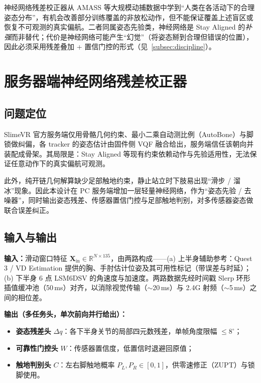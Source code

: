 \documentclass[scheme=plain,UTF8,11pt,a4paper]{ctexart}
\begin{document}
神经网络残差校正器从 AMASS 等大规模动捕数据中学到“人类在各活动下的合理姿态分布”，有机会改善部分训练覆盖的非放松动作，但不能保证覆盖上述盲区或恢复不可观测的真实偏航。二者同属姿态先验类，神经网络是 Stay Aligned 的\emph{补强}而非替代；代价是神经网络可能产生“幻觉”（将姿态掰到合理但错误的位置），因此必须采用残差叠加 + 置信门控的形式（见~\ref{subsec:discipline}）。

\section{服务器端神经网络残差校正器}
\label{sec:nn}

\subsection{问题定位}

SlimeVR 官方服务端仅用骨骼几何约束、最小二乘自动测比例（AutoBone）与脚锁做纠偏，各 tracker 的姿态估计由固件侧 VQF 融合给出，服务端信任该朝向并装配成骨架。其局限是：Stay Aligned 等现有约束依赖动作与先验适用性，无法保证任意动作下的真实偏航可观测。

此外，纯开链几何解算缺少足部触地约束，静止站立时下肢易出现“滑步 / 溜冰”现象。因此本设计在 PC 服务端增加一层轻量神经网络，作为“姿态先验 / 去噪器”，同时输出姿态残差、传感器置信门控与足部触地判别，对多传感器姿态做联合误差纠正。

\subsection{输入与输出}

\textbf{输入：}滑动窗口特征 $\mathbf{X}_{\text{in}} \in \mathbb{R}^{N \times 135}$，由两路构成——(a) 上半身辅助参考：Quest 3 / VD Estimation 提供的胸、手肘估计位姿及其可用性标记（带误差与时延）；(b) 下半身 6 点 LSM6DSV 的角速度与加速度。两路数据先经时间戳 Slerp 环形插值缓冲池（50\,ms）对齐，以消除视觉传输（$\sim$20\,ms）与 2.4G 射频（$\sim$5\,ms）之间的相位差。

\textbf{输出（多任务头，单次前向并行给出）：}
\begin{itemize}
    \item \textbf{姿态残差头} $\Delta q$：各下半身关节的局部四元数残差，单帧角度限幅 $\le 8^{\circ}$；
    \item \textbf{可靠性门控头} $W$：传感器置信度，低置信时退避回原值；
    \item \textbf{触地判别头} $C$：左右脚触地概率 $P_L, P_R \in [0,1]$，供零速修正（ZUPT）与锁脚使用。
\end{itemize}
\end{document}
